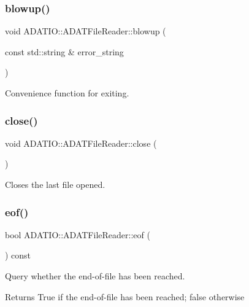 \subsubsection{\texorpdfstring{blowup()}{blowup()}}
{\footnotesize\ttfamily void A\+D\+A\+T\+I\+O\+::\+A\+D\+A\+T\+File\+Reader\+::blowup (\begin{DoxyParamCaption}\item[{const std\+::string \&}]{error\+\_\+string }\end{DoxyParamCaption})\hspace{0.3cm}{\ttfamily [protected]}}



Convenience function for exiting. 

\mbox{\label{classADATIO_1_1ADATFileReader_ga8b86dba1600272d26539815146f04078}} 
\subsubsection{\texorpdfstring{close()}{close()}}
{\footnotesize\ttfamily void A\+D\+A\+T\+I\+O\+::\+A\+D\+A\+T\+File\+Reader\+::close (\begin{DoxyParamCaption}{ }\end{DoxyParamCaption})}



Closes the last file opened. 

\mbox{\label{classADATIO_1_1ADATFileReader_ga22337f3cfe1b2ecd1ead8d2755a1f9ca}} 
\subsubsection{\texorpdfstring{eof()}{eof()}}
{\footnotesize\ttfamily bool A\+D\+A\+T\+I\+O\+::\+A\+D\+A\+T\+File\+Reader\+::eof (\begin{DoxyParamCaption}{ }\end{DoxyParamCaption}) const}



Query whether the end-\/of-\/file has been reached. 

\begin{DoxyReturn}{Returns}
True if the end-\/of-\/file has been reached; false otherwise 
\end{DoxyReturn}
\mbox{\label{classADATIO_1_1ADATFileReader_ga40c1ee10fe351724bdfc91f4fd655328}} 
